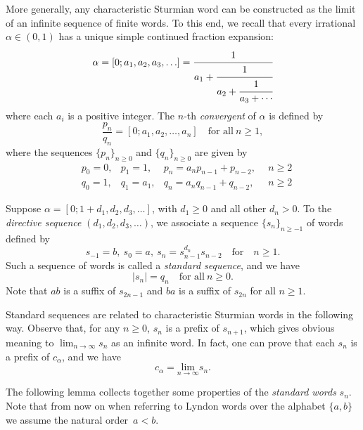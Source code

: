 \documentclass[11pt]{amsart}
\newcommand{\1}{\bar{1}}
\theoremstyle{plain}
\theoremstyle{definition}
\theoremstyle{remark}
\begin{document}
More generally, any characteristic Sturmian word can be constructed as the limit of an infinite sequence of finite words. To this end, we recall that every irrational $\alpha \in (0,1)$ has a unique simple
continued fraction expansion:  \vspace*{-1em}
\[ %
  \alpha = [0;a_1,a_2,a_3,\ldots] = \cfrac{1}{a_1+
                                \cfrac{1}{a_2 +
                                \cfrac{1}{a_3 + \cdots
                                 }}}
\]
where each $a_i$ is a positive integer. The $n$-th \emph{convergent} of $\alpha$ is defined by
\[
  \frac{p_n}{q_n} = [0;a_1,a_2,\ldots,a_n] \quad \mbox{for all} ~n\geq 1,
\]
where the sequences $\{p_n\}_{n\geq0}$ and $\{q_n\}_{n\geq0}$ are
given by
\[
\begin{matrix}
 &p_{0} = 0, &p_{1} = 1, &p_n = a_np_{n-1} + p_{n-2}, ~~&n\geq 2 \\
 &q_{0} = 1, &q_{1} = a_1, &q_n = a_nq_{n-1} + q_{n-2}, ~~&n\geq 2
\end{matrix}
\]

Suppose $\alpha = [0;1+d_1,d_2,d_3, \ldots]$, with $d_1 \geq 0$
and all other $d_n > 0$. To the \emph{directive sequence}
$(d_1,d_2,d_3,\ldots)$, we associate a sequence $\{s_n\}_{n \geq
-1}$ of words defined by
\[
  s_{-1} = b, ~s_{0} = a, ~s_{n} = s_{n-1}^{d_{n}}s_{n-2} \quad \mbox{for} \quad n \geq 1.
\]
Such a sequence of words is called a \emph{standard sequence}, and
we have
\[
  |s_n| = q_n \quad \mbox{for all} ~n\geq0.
\]
Note that $ab$ is a suffix of $s_{2n-1}$ and $ba$ is a suffix of
$s_{2n}$ for all $n \geq 1$.

Standard sequences are related to characteristic Sturmian words in
the following way. Observe that, for any $n\geq0$, $s_n$ is a
prefix of $s_{n+1}$, which gives obvious meaning to $\lim_{n\to\infty} s_n$ as an infinite word. In
fact, one can prove \cite{aFmMuT78dete,tB93desc} that each $s_n$
is a prefix of $c_\alpha$, and we have
\[
c_{\alpha} = \underset{n \rightarrow \infty}{\mbox{lim}}s_n.
\]

The following lemma collects together some properties of the \textit{standard words} $s_n$. Note that from now on when referring to Lyndon words over the alphabet $\{a,b\}$ we assume the natural order~$a < b$.
\end{document}
